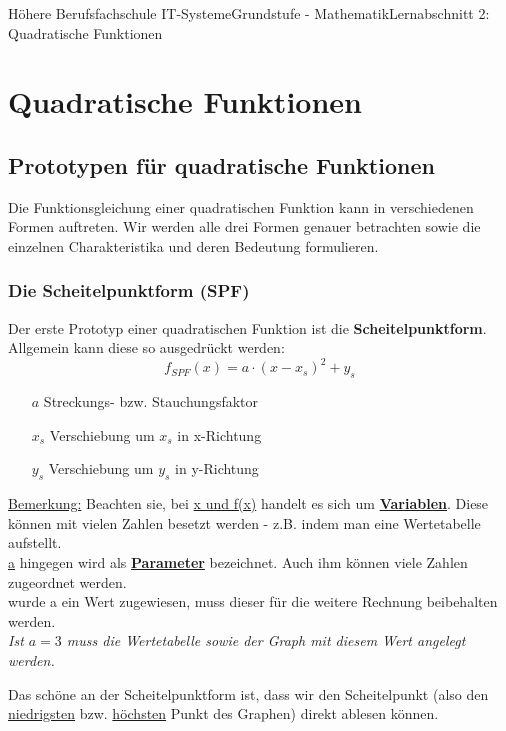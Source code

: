 \documentclass[11pt,twocolumn,oneside,openany,headings=optiontotoc,11pt,numbers=noenddot]{article}
\begin{document}
	\begin{worksheet}{Höhere Berufsfachschule IT-Systeme}{Grundstufe - Mathematik}{Lernabschnitt 2: Quadratische Funktionen}
		\section{Quadratische Funktionen}
		\subsection{Prototypen für quadratische Funktionen}
		Die Funktionsgleichung einer quadratischen Funktion kann in verschiedenen Formen auftreten. Wir werden alle drei Formen genauer betrachten sowie die einzelnen Charakteristika und deren Bedeutung formulieren.
		\subsubsection*{Die Scheitelpunktform (SPF)}
		Der erste Prototyp einer quadratischen Funktion ist die \textbf{Scheitelpunktform}. Allgemein kann diese so ausgedrückt werden: \[f_{SPF}(x) = a\cdot(x-x_s)^2+y_s\]
		\begin{itemize}
			\item[\(a\)] Streckungs- bzw. Stauchungsfaktor
			\item[\(x_s\)] Verschiebung um \(x_s\) in x-Richtung
			\item[\(y_s\)] Verschiebung um \(y_s\) in y-Richtung
		\end{itemize}
		\par\noindent
		\begin{framed}
			\noindent
			\underline{Bemerkung:} Beachten sie, bei \underline{x und f(x)} handelt es sich um \textbf{\underline{Variablen}}. Diese können mit vielen Zahlen besetzt werden - z.B. indem man eine Wertetabelle aufstellt.\\
			\underline{a} hingegen wird als \textbf{\underline{Parameter}} bezeichnet. Auch ihm können viele Zahlen zugeordnet werden.\\ \color{red}{Aber}\normalcolor{} wurde a ein Wert zugewiesen, muss dieser für die weitere Rechnung beibehalten werden.\\ \textit{\small{Ist \(a=3\) muss die Wertetabelle sowie der Graph mit diesem Wert angelegt werden.}}
		\end{framed}
		\noindent
		Das schöne an der Scheitelpunktform ist, dass wir den Scheitelpunkt (also den \underline{niedrigsten} bzw. \underline{höchsten} Punkt des Graphen) direkt ablesen können.\\

\end{worksheet}
\end{document}
